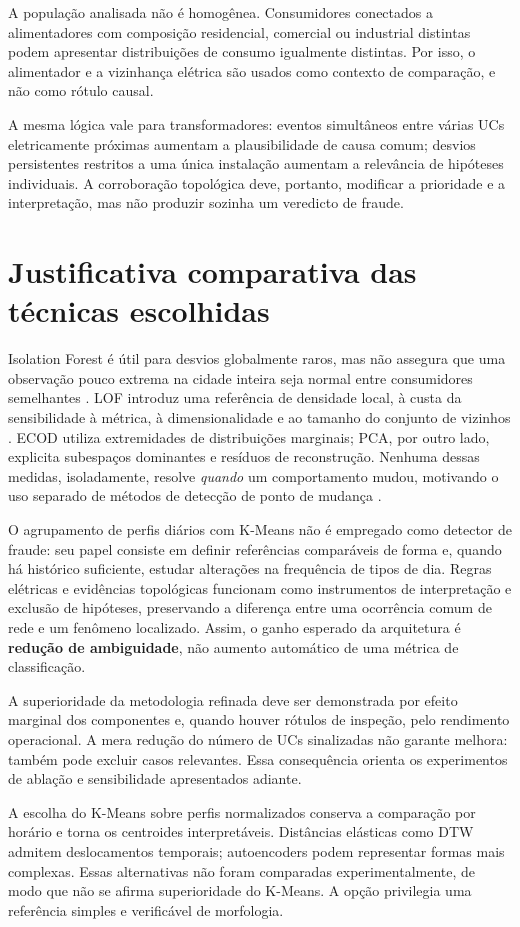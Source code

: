 A população analisada não é homogênea. Consumidores conectados a alimentadores com composição residencial, comercial ou industrial distintas podem apresentar distribuições de consumo igualmente distintas. Por isso, o alimentador e a vizinhança elétrica são usados como contexto de comparação, e não como rótulo causal.

A mesma lógica vale para transformadores: eventos simultâneos entre várias UCs eletricamente próximas aumentam a plausibilidade de causa comum; desvios persistentes restritos a uma única instalação aumentam a relevância de hipóteses individuais. A corroboração topológica deve, portanto, modificar a prioridade e a interpretação, mas não produzir sozinha um veredicto de fraude.

\section{Justificativa comparativa das técnicas escolhidas}\label{justificativa-comparativa-das-tuxe9cnicas-escolhidas}

Isolation Forest é útil para desvios globalmente raros, mas não assegura que uma observação pouco extrema na cidade inteira seja normal entre consumidores semelhantes \autocite{liu2008}. LOF introduz uma referência de densidade local, à custa da sensibilidade à métrica, à dimensionalidade e ao tamanho do conjunto de vizinhos \autocite{breunig2000}. ECOD utiliza extremidades de distribuições marginais; PCA, por outro lado, explicita subespaços dominantes e resíduos de reconstrução. Nenhuma dessas medidas, isoladamente, resolve \emph{quando} um comportamento mudou, motivando o uso separado de métodos de detecção de ponto de mudança \autocite{truong2020}.

O agrupamento de perfis diários com K-Means não é empregado como detector de fraude: seu papel consiste em definir referências comparáveis de forma e, quando há histórico suficiente, estudar alterações na frequência de tipos de dia. Regras elétricas e evidências topológicas funcionam como instrumentos de interpretação e exclusão de hipóteses, preservando a diferença entre uma ocorrência comum de rede e um fenômeno localizado. Assim, o ganho esperado da arquitetura é \textbf{redução de ambiguidade}, não aumento automático de uma métrica de classificação.

A superioridade da metodologia refinada deve ser demonstrada por efeito marginal dos componentes e, quando houver rótulos de inspeção, pelo rendimento operacional. A mera redução do número de UCs sinalizadas não garante melhora: também pode excluir casos relevantes. Essa consequência orienta os experimentos de ablação e sensibilidade apresentados adiante.


A escolha do K-Means sobre perfis normalizados conserva a comparação por horário e torna os centroides interpretáveis. Distâncias elásticas como DTW admitem deslocamentos temporais; autoencoders podem representar formas mais complexas. Essas alternativas não foram comparadas experimentalmente, de modo que não se afirma superioridade do K-Means. A opção privilegia uma referência simples e verificável de morfologia.


